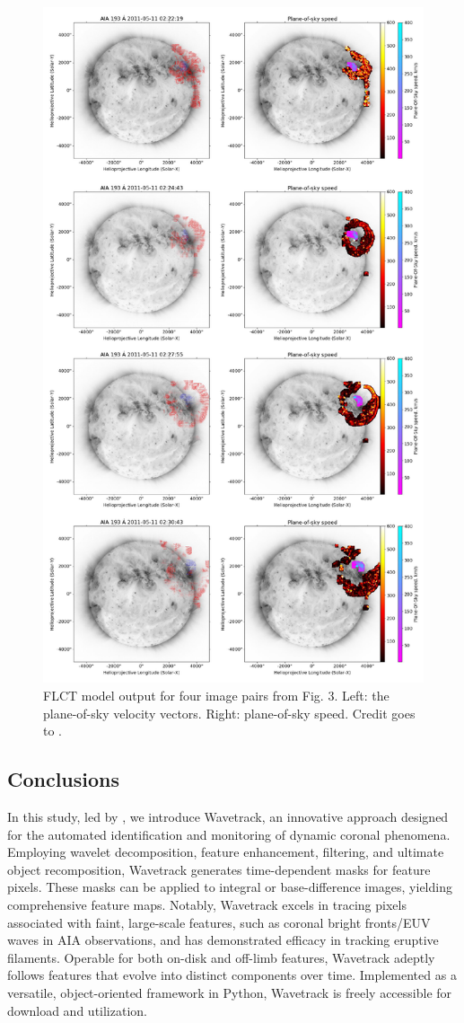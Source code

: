 \begin{figure}
	\centering
	\includegraphics[width=0.7\hsize]{chapter2/figs/flct_wave_filament_doubleplot_figure_110511.png}
	\caption{FLCT model output for four image pairs from Fig. 3. Left: the plane-of-sky velocity vectors. Right: plane-of-sky speed. Credit goes to \citet{stepanyuk_2022}.}
	\label{fig_flct_110511}
\end{figure}

\subsection{Conclusions}
In this study, led by \citet{stepanyuk_2022}, we introduce Wavetrack, an innovative approach designed for the automated identification and monitoring of dynamic coronal phenomena. Employing wavelet decomposition, feature enhancement, filtering, and ultimate object recomposition, Wavetrack generates time-dependent masks for feature pixels. These masks can be applied to integral or base-difference images, yielding comprehensive feature maps. Notably, Wavetrack excels in tracing pixels associated with faint, large-scale features, such as coronal bright fronts/EUV waves in AIA observations, and has demonstrated efficacy in tracking eruptive filaments.
Operable for both on-disk and off-limb features, Wavetrack adeptly follows features that evolve into distinct components over time. Implemented as a versatile, object-oriented framework in Python, Wavetrack is freely accessible for download and utilization.


